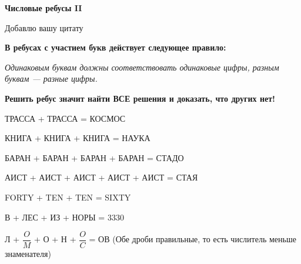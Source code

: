 \centerline{\bf \Huge Числовые ребусы II}

\begin{flushright}
        \scriptsize{Добавлю вашу цитату}
\end{flushright}

\textbf{В ребусах с участием букв действует следующее правило: }

\textit{Одинаковым буквам должны соответствовать одинаковые цифры, разным буквам — разные цифры.}

\textbf{Решить ребус значит найти ВСЕ решения и доказать, что других нет!}

 ТРАССА + ТРАССА = КОСМОС

 КНИГА + КНИГА + КНИГА = НАУКА

 БАРАН + БАРАН + БАРАН + БАРАН = СТАДО

 АИСТ + АИСТ + АИСТ + АИСТ + АИСТ = СТАЯ

 FORTY + TEN + TEN = SIXTY

 В + ЛЕС + ИЗ + НОРЫ = 3330

 Л + $\dfrac{O}{M}$ + О + Н + $\dfrac{O}{C}$ = ОВ (Обе дроби правильные, то есть числитель меньше знаменателя)